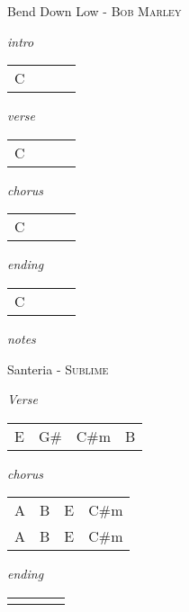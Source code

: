 \documentclass[12pt]{article}
\begin{document}
{\Huge Bend Down Low} {\huge - \textsc{Bob Marley}}

\huge
\textit{intro}

\begin{tabular}{|P{1.25in}|P{1.25in}|P{1.25in}|P{1.25in}|}
  C &   &   &   \\
\end{tabular}

\textit{verse}

\begin{tabular}{|P{1.25in}|P{1.25in}|P{1.25in}|P{1.25in}|}
  C &   &   &   \\
\end{tabular}

\textit{chorus}

\begin{tabular}{|P{1.25in}|P{1.25in}|P{1.25in}|P{1.25in}|}
  C &   &   &   \\
\end{tabular}

\textit{ending}

\begin{tabular}{|P{1.25in}|P{1.25in}|P{1.25in}|P{1.25in}|}
  C &   &   &   \\
\end{tabular}

\textit{notes}

\newpage

{\Huge Santeria} {\huge - \textsc{Sublime}}

\huge
\textit{Verse}

\begin{tabular}{|P{1.25in}|P{1.25in}|P{1.25in}|P{1.25in}|}
  E & G\#  & C\#m  & B  \\
\end{tabular}

\textit{chorus}

\begin{tabular}{|P{1.25in}|P{1.25in}|P{1.25in}|P{1.25in}|}
  A &  B & E  &  C\#m \\
  A &  B & E  &  C\#m \\
  
\end{tabular}

\textit{ending}

\begin{tabular}{|P{1.25in}|P{1.25in}|P{1.25in}|P{1.25in}|}
    &    &   &   \\
\end{tabular}
\end{document}
